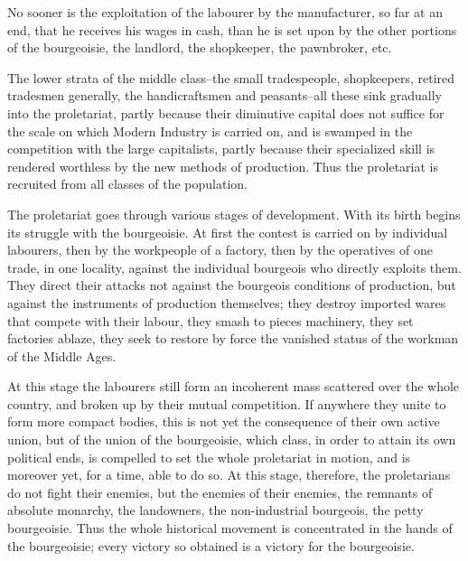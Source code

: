 \documentclass[11pt]{book}
\begin{document}
No sooner is the exploitation of the labourer by the manufacturer,
so far at an end, that he receives his wages in cash, than he is
set upon by the other portions of the bourgeoisie, the landlord,
the shopkeeper, the pawnbroker, etc.

The lower strata of the middle class--the small tradespeople,
shopkeepers, retired tradesmen generally, the handicraftsmen and
peasants--all these sink gradually into the proletariat, partly
because their diminutive capital does not suffice for the scale
on which Modern Industry is carried on, and is swamped in the
competition with the large capitalists, partly because their
specialized skill is rendered worthless by the new methods of
production.  Thus the proletariat is recruited from all classes
of the population.

The proletariat goes through various stages of development.
With its birth begins its struggle with the bourgeoisie.  At
first the contest is carried on by individual labourers, then by
the workpeople of a factory, then by the operatives of one trade,
in one locality, against the individual bourgeois who directly
exploits them.  They direct their attacks not against the
bourgeois conditions of production, but against the instruments
of production themselves; they destroy imported wares that
compete with their labour, they smash to pieces machinery, they
set factories ablaze, they seek to restore by force the vanished
status of the workman of the Middle Ages.

At this stage the labourers still form an incoherent mass
scattered over the whole country, and broken up by their mutual
competition.  If anywhere they unite to form more compact bodies,
this is not yet the consequence of their own active union, but of
the union of the bourgeoisie, which class, in order to attain its
own political ends, is compelled to set the whole proletariat in
motion, and is moreover yet, for a time, able to do so.  At this
stage, therefore, the proletarians do not fight their enemies,
but the enemies of their enemies, the remnants of absolute
monarchy, the landowners, the non-industrial bourgeois, the petty
bourgeoisie.  Thus the whole historical movement is concentrated
in the hands of the bourgeoisie; every victory so obtained is a
victory for the bourgeoisie.
\end{document}
